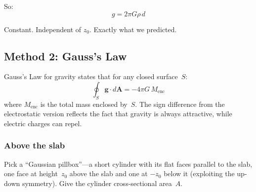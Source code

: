 \documentclass[11pt, letterpaper]{article}
\begin{document}
So:
\begin{equation}
  \boxed{\;g = 2\pi G \rho\, d\;}
  \label{eq:slab}
\end{equation}

Constant. Independent of $z_0$. Exactly what we predicted.

\subsection{Method 2: Gauss's Law}

Gauss's Law for gravity states that for any closed surface~$S$:
\begin{equation}
  \oint_S \mathbf{g} \cdot d\mathbf{A} = -4\pi G\, M_{\text{enc}}
\end{equation}
where $M_{\text{enc}}$ is the total mass enclosed by~$S$. The sign difference from the electrostatic version reflects the fact that gravity is always attractive, while electric charges can repel.

\subsubsection{Above the slab}

Pick a ``Gaussian pillbox''---a short cylinder with its flat faces parallel to the slab, one face at height~$z_0$ above the slab and one at $-z_0$ below it (exploiting the up-down symmetry). Give the cylinder cross-sectional area~$A$.

\end{document}
